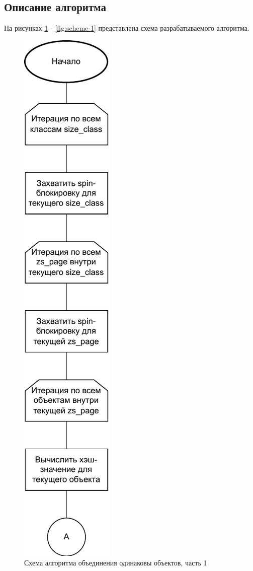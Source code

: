 \subsection{Описание алгоритма}

На рисунках \ref{fig:scheme-0} - \ref{fig:scheme-1} представлена схема разрабатываемого алгоритма.

\begin{figure}[h]
	\centering
	\includegraphics[scale=1.3]{img/scheme-0.pdf}
	\caption{Схема алгоритма объединения одинаковы объектов, часть 1}
	\label{fig:scheme-0}
\end{figure}

